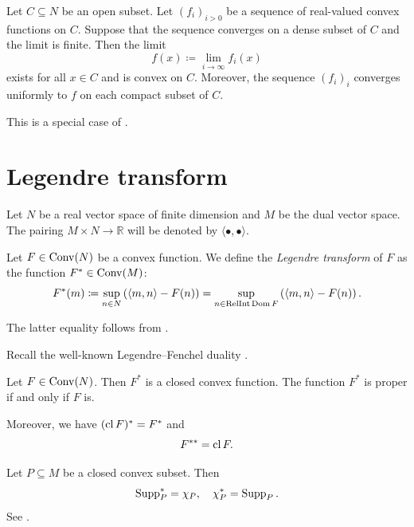 \begin{theorem}\label{thm:seqconv}
    Let $C\subseteq N$ be an open subset. Let $(f_i)_{i>0}$ be a sequence of real-valued convex functions on $C$. Suppose that the sequence converges on a dense subset of $C$ and the limit is finite. Then the limit
    \[
    f(x)\coloneqq \lim_{i\to\infty} f_i(x)
    \]
    exists for all $x\in C$ and is convex on $C$. Moreover, the sequence $(f_i)_i$ converges uniformly to $f$ on each compact subset of $C$.
\end{theorem}
This is a special case of \cite[Theorem~10.8]{Roc70}.


\section{Legendre transform}\label{sec:Leg}
Let $N$ be a real vector space of finite dimension and $M$ be the dual vector space.
The pairing $M\times N\rightarrow \mathbb{R}$ will be denoted by $\langle \bullet, \bullet \rangle$.

\begin{definition}\label{def:Legendregeneral}
    Let $F\in \mathrm{Conv}(N)$ be a convex function. We define the \emph{Legendre transform} of $F$ as the function $F^*\in \mathrm{Conv}(M)$:
    \begin{equation}\label{eq:Legtrandef}
        F^*(m)\coloneqq \sup_{n\in N} \left( \langle m,n \rangle-F(n) \right)=\sup_{n\in \operatorname{RelInt} \operatorname{Dom} F} \left( \langle m,n \rangle-F(n) \right).
    \end{equation}
\end{definition}
The latter equality follows from \cite[Corollary~12.2.2]{Roc70}.

Recall the well-known Legendre--Fenchel duality \cite[Theorem~12.2]{Roc70}.
\begin{theorem}\label{thm:Legendredual}
    Let $F\in \mathrm{Conv}(N)$. Then $F^*$ is a closed convex function. The function $F^*$ is proper if and only if $F$ is.

    Moreover, we have $(\operatorname{cl} F)^*=F^*$ and
    \[
        F^{**}=\operatorname{cl} F.
    \]
\end{theorem}

\begin{example}\label{ex:suppfundual}
    Let $P\subseteq M$ be a closed convex subset. Then
    \[
    \operatorname{Supp}_P^*=\chi_P,\quad \chi_P^*=\operatorname{Supp}_P.
    \]
    See \cite[Theorem~13.2]{Roc70}.
\end{example}

